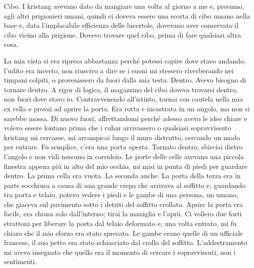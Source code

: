 \hfill\break

Cibo. I kristang avevano dato da mangiare una volta al giorno a me e,
presumo, agli altri prigionieri umani, quindi ci doveva essere una
scorta di cibo umano nella base e, data l'implacabile efficienza delle
lucertole, dovevano aver conservato il cibo vicino alla prigione. Dovevo
trovare quel cibo, prima di fare qualsiasi altra cosa.

La mia vista si era ripresa abbastanza perché potessi capire dove stavo
andando, l'udito era incerto, non riuscivo a dire se i suoni mi stessero
riverberando nei timpani colpiti, o provenissero da fuori dalla mia
testa. Dentro. Avevo bisogno di tornare dentro. A rigor di logica, il
magazzino del cibo doveva trovarsi dentro, non fuori dove stavo io.
Contravvenendo all'istinto, tornai con cautela nella mia ex cella e
provai ad aprire la porta. Era rotta e incastrata in un angolo, ma non
si sarebbe mossa. Di nuovo fuori, affrettandomi perché adesso avevo le
idee chiare e volevo essere lontano prima che i ruhar arrivassero o
qualsiasi sopravvissuto kristang mi cercasse, mi arrampicai lungo il
muro distrutto, cercando un modo per entrare. Fu semplice, c'era una
porta aperta. Tornato dentro, sbirciai dietro l'angolo e non vidi
nessuno in corridoio. Le porte delle celle avevano una piccola finestra
appena più in alto del mio occhio, mi misi in punta di piedi per
guardare dentro. La prima cella era vuota. La seconda anche. La porta
della terza era in parte socchiusa a causa di una grande crepa che
arrivava al soffitto e, guardando tra porta e telaio, potevo vedere i
piedi e le gambe di una persona, un umano, che giaceva sul pavimento
sotto i detriti del soffitto crollato. Aprire la porta era facile, era
chiusa solo dall'interno; tirai la maniglia e l'aprii. Ci vollero due
forti strattoni per liberare la porta dal telaio deformato e, una volta
entrato, mi fu chiaro che il mio sforzo era stato sprecato. Le gambe
erano quelle di un ufficiale francese, il suo petto era stato
schiacciato dal crollo del soffitto. L'addestramento mi aveva insegnato
che quello era il momento di cercare i sopravvissuti, non i sentimenti.

